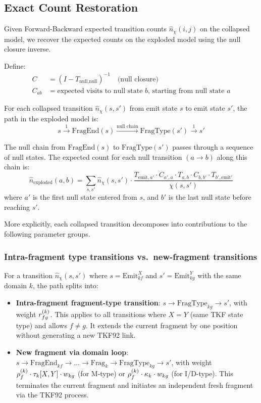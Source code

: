 \subsection{Exact Count Restoration}
\label{sec:count-restoration}

Given Forward-Backward expected transition counts $\hat{n}_\chi(i,j)$
on the collapsed model, we recover the expected counts on the
exploded model using the null closure inverse.

Define:
\begin{align}
C &= (I - T_{\text{null},\text{null}})^{-1} \quad\text{(null closure)} \\
C_{ab} &= \text{expected visits to null state $b$, starting from null state $a$}
\end{align}

For each collapsed transition $\hat{n}_\chi(s, s')$ from emit state $s$
to emit state $s'$, the path in the exploded model is:
\[
s \xrightarrow{1} \text{FragEnd}(s) \xrightarrow{\text{null chain}} \text{FragType}(s') \xrightarrow{1} s'
\]

The null chain from $\text{FragEnd}(s)$ to $\text{FragType}(s')$ passes
through a sequence of null states. The expected count for each null
transition $(a \to b)$ along this chain is:
\begin{equation}
\hat{n}_{\text{exploded}}(a, b) = \sum_{s, s'} \hat{n}_\chi(s, s')
\cdot \frac{T_{\text{emit},a'} \cdot C_{a',a} \cdot T_{a,b} \cdot C_{b,b'} \cdot T_{b',\text{emit}'}}
           {\chi(s, s')}
\label{eq:count-restoration-general}
\end{equation}
where $a'$ is the first null state entered from $s$, and $b'$ is the
last null state before reaching $s'$.

More explicitly, each collapsed transition decomposes into contributions
to the following parameter groups.

\subsubsection{Intra-fragment type transitions vs.\ new-fragment transitions}

For a transition $\hat{n}_\chi(s, s')$ where $s = \text{Emit}_{kf}^X$
and $s' = \text{Emit}_{kg}^Y$ with the same domain $k$, the path
splits into:
\begin{itemize}[nosep]
\item \textbf{Intra-fragment fragment-type transition}: $s \to \text{FragType}_{kg} \to s'$,
  with weight $r^{(k)}_{fg}$. This applies to all transitions where
  $X = Y$ (same TKF state type) and allows $f \neq g$. It extends the
  current fragment by one position without generating a new TKF92 link.
\item \textbf{New fragment via domain loop}: $s \to \text{FragEnd}_{kf} \to \ldots \to \text{Frag}_k \to \text{FragType}_{kg} \to s'$,
  with weight $\rho^{(k)}_f \cdot \tau_k[X,Y] \cdot w_{kg}$ (for M-type)
  or $\rho^{(k)}_f \cdot \kappa_k \cdot w_{kg}$ (for I/D-type). This
  terminates the current fragment and initiates an independent fresh
  fragment via the TKF92 process.
\end{itemize}


